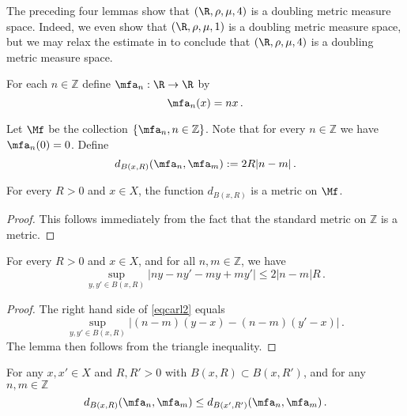 The preceding four lemmas show that $(\R, \rho, \mu, 4)$ is a doubling metric measure space. Indeed, we even show
that $(\R, \rho, \mu, 1)$ is a doubling metric measure space, but we may relax the estimate in  to conclude that $(\R, \rho, \mu, 4)$
is a doubling metric measure space.


For each $n\in \mathbb{Z}$ define
$\mfa_n:\R\to \R$ by
\begin{equation}
    \mfa_n(x)=nx\, .
\end{equation}


Let $\Mf$ be the collection $\{\mfa_n, n\in \mathbb{Z}\}$.
Note that for every $n\in \mathbb{Z}$ we have $\mfa_n(0)=0$.
Define
\begin{equation}
    \label{eqcarl4}
    d_{B(x,R)}(\mfa_n, \mfa_m) := 2R|n-m|\,.
\end{equation}

\begin{lemma}
    \label{frequency-metric}
    For every $R > 0$ and $x \in X$, the function $d_{B(x,R)}$ is a metric on $\Mf$.
\end{lemma}

\begin{proof}
    This follows immediately from the fact that the standard metric on $\mathbb{Z}$ is a metric.
\end{proof}

\begin{lemma}
    \label{oscillation-control}
    For every $R > 0$ and $x \in X$, and for all $n, m \in \mathbb{Z}$, we have
    \begin{equation}\label{eqcarl2}
       \sup_{y,y'\in B(x,R)}|ny-ny'-my+my'|\le 2|n-m|R\, .
    \end{equation}
\end{lemma}

\begin{proof}
    The right hand side of \eqref{eqcarl2} equals
    $$
        \sup_{y,y'\in B(x,R)}|(n-m)(y-x)-(n-m)(y'-x)|\,.
    $$
    The lemma then follows from the triangle inequality.
\end{proof}

\begin{lemma}
\label{frequency-monotone}

    For any $x, x' \in X$ and $R, R' > 0$ with $B(x,R) \subset B(x, R')$, and for any $n, m \in \mathbb{Z}$
    $$
        d_{B(x,R)}(\mfa_n, \mfa_m) \le d_{B(x',R')}(\mfa_n, \mfa_m)\,.
    $$
\end{lemma}

